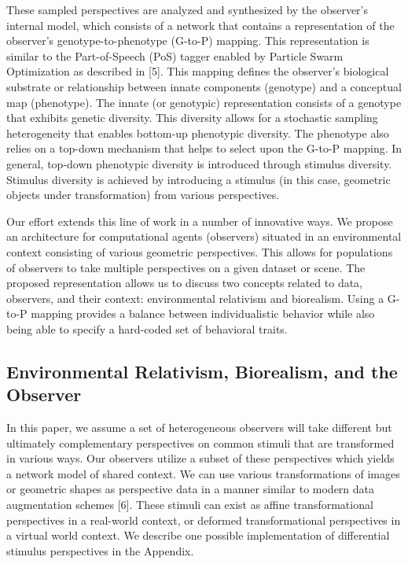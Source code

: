 \documentclass{article}
\begin{document}
These sampled perspectives are analyzed and synthesized by the observer’s internal model, which consists of a network that contains a representation of the observer’s genotype-to-phenotype (G-to-P) mapping. This representation is similar to the Part-of-Speech (PoS) tagger enabled by Particle Swarm Optimization as described in [5]. This mapping defines the observer’s biological substrate or relationship between innate components (genotype) and a conceptual map (phenotype). The innate (or genotypic) representation consists of a genotype that exhibits genetic diversity. This diversity allows for a stochastic sampling heterogeneity that enables bottom-up phenotypic diversity. The phenotype also relies on a top-down mechanism that helps to select upon the G-to-P mapping. In general, top-down phenotypic diversity is introduced through stimulus diversity. Stimulus diversity is achieved by introducing a stimulus (in this case, geometric objects under transformation) from various perspectives. 

Our effort extends this line of work in a number of innovative ways. We propose an architecture for computational agents (observers) situated in an environmental context consisting of various geometric perspectives. This allows for populations of observers to take multiple perspectives on a given dataset or scene. The proposed representation allows us to discuss two concepts related to data, observers, and their context: environmental relativism and biorealism. Using a G-to-P mapping provides a balance between individualistic behavior while also being able to specify a hard-coded set of behavioral traits. 

\subsection{Environmental Relativism, Biorealism, and the Observer}
In this paper, we assume a set of heterogeneous observers will take different but ultimately complementary perspectives on common stimuli that are transformed in various ways. Our observers utilize a subset of these perspectives which yields a network model of shared context. We can use various transformations of images or geometric shapes as perspective data in a manner similar to modern data augmentation schemes [6]. These stimuli can exist as affine transformational perspectives in a real-world context, or deformed transformational perspectives in a virtual world context. We describe one possible implementation of differential stimulus perspectives in the Appendix.
\end{document}
